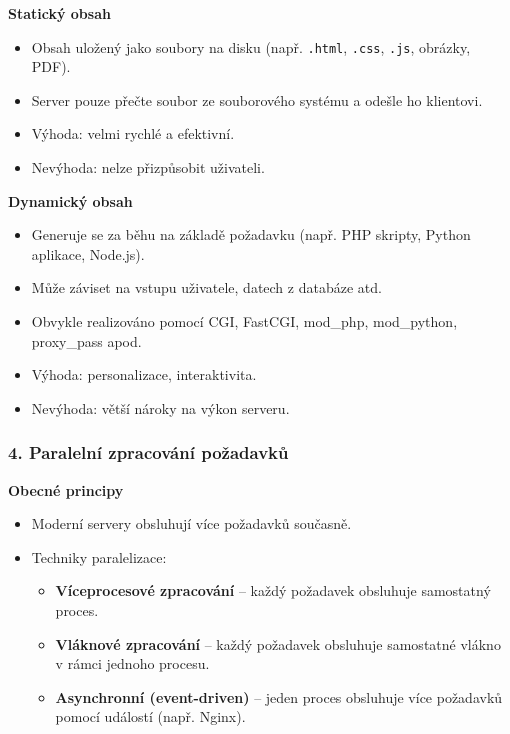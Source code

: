 \textbf{Statický obsah}

\begin{itemize}
    \item Obsah uložený jako soubory na disku (např. \texttt{.html}, \texttt{.css}, \texttt{.js}, obrázky, PDF).
    \item Server pouze přečte soubor ze souborového systému a odešle ho klientovi.
    \item Výhoda: velmi rychlé a efektivní.
    \item Nevýhoda: nelze přizpůsobit uživateli.
\end{itemize}

\textbf{Dynamický obsah}

\begin{itemize}
    \item Generuje se za běhu na základě požadavku (např. PHP skripty, Python aplikace, Node.js).
    \item Může záviset na vstupu uživatele, datech z databáze atd.
    \item Obvykle realizováno pomocí CGI, FastCGI, mod\_php, mod\_python, proxy\_pass apod.
    \item Výhoda: personalizace, interaktivita.
    \item Nevýhoda: větší nároky na výkon serveru.
\end{itemize}

\subsubsection*{4. Paralelní zpracování požadavků}

\textbf{Obecné principy}

\begin{itemize}
    \item Moderní servery obsluhují více požadavků současně.
    \item Techniky paralelizace:
    \begin{itemize}
        \item \textbf{Víceprocesové zpracování} – každý požadavek obsluhuje samostatný proces.
        \item \textbf{Vláknové zpracování} – každý požadavek obsluhuje samostatné vlákno v rámci jednoho procesu.
        \item \textbf{Asynchronní (event-driven)} – jeden proces obsluhuje více požadavků pomocí událostí (např. Nginx).
    \end{itemize}
\end{itemize}

